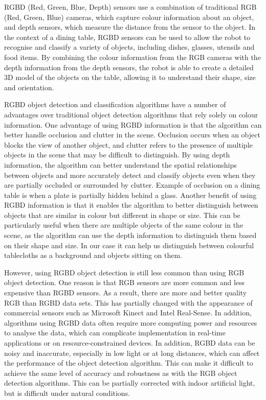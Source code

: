 \documentclass[10pt,twocolumn,letterpaper]{article}
\begin{document}
RGBD (Red, Green, Blue, Depth) sensors\cite{Tychola_Tsimperidis_Papakostas_2022} use a combination of traditional RGB (Red, Green, Blue) cameras, which capture colour information about an object, and depth sensors, which measure the distance from the sensor to the object. In the context of a dining table, RGBD sensors can be used to allow the robot to recognise and classify a variety of objects, including dishes, glasses, utensils and food items. By combining the colour information from the RGB cameras with the depth information from the depth sensors, the robot is able to create a detailed 3D model of the objects on the table, allowing it to understand their shape, size and orientation. 

RGBD object detection and classification algorithms have a number of advantages over traditional object detection algorithms that rely solely on colour information\cite{Rosin_Lai_Shao_Liu_2019}. One advantage of using RGBD information is that the algorithm can better handle occlusion and clutter in the scene. Occlusion occurs when an object blocks the view of another object, and clutter refers to the presence of multiple objects in the scene that may be difficult to distinguish. By using depth information, the algorithm can better understand the spatial relationships between objects and more accurately detect and classify objects even when they are partially occluded or surrounded by clutter. Example of occlusion on a dining table is when a plate is partially hidden behind a glass. Another benefit of using RGBD information is that it enables the algorithm to better distinguish between objects that are similar in colour but different in shape or size. This can be particularly useful when there are multiple objects of the same colour in the scene, as the algorithm can use the depth information to distinguish them based on their shape and size. In our case it can help us distinguish between colourful tablecloths as a background and objects sitting on them. 

However, using RGBD object detection is still less common than using RGB object detection. One reason is that RGB sensors are more common and less expensive than RGBD sensors. As a result, there are more and better quality RGB than RGBD data sets. This has partially changed with the appearance of commercial sensors such as Microsoft Kinect and Intel Real-Sense. In addition, algorithms using RGBD data often require more computing power and resources to analyse the data, which can complicate implementation in real-time applications or on resource-constrained devices. In addition, RGBD data can be noisy and inaccurate, especially in low light or at long distances, which can affect the performance of the object detection algorithm. This can make it difficult to achieve the same level of accuracy and robustness as with the RGB object detection algorithms. This can be partially corrected with indoor artificial light, but is difficult under natural conditions.
\end{document}
